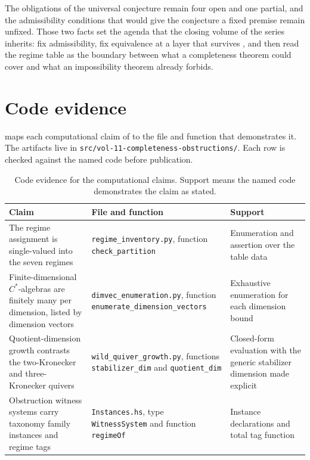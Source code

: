 \documentclass[11pt,letterpaper]{article}
\theoremstyle{definition}
\theoremstyle{remark}
\begin{document}
The obligations of the universal conjecture remain four open and one partial, and the admissibility conditions that would give the conjecture a fixed premise remain unfixed. Those two facts set the agenda that the closing volume of the series inherits: fix admissibility, fix equivalence at a layer that survives , and then read the regime table as the boundary between what a completeness theorem could cover and what an impossibility theorem already forbids.

\appendix
\section{Code evidence}

 maps each computational claim of  to the file and function that demonstrates it. The artifacts live in \texttt{src/vol-11-completeness-obstructions/}. Each row is checked against the named code before publication.

\begin{table}[ht]
\centering
\caption{Code evidence for the computational claims. Support means the named code demonstrates the claim as stated.}
\label{tab:code}
\footnotesize
\begin{tabular}{L{4.2cm}L{5.2cm}L{3.4cm}}
\toprule
Claim & File and function & Support \\
\midrule
The regime assignment is single-valued into the seven regimes & \texttt{regime\_inventory.py}, function \texttt{check\_partition} & Enumeration and assertion over the table data \\
Finite-dimensional $C^*$-algebras are finitely many per dimension, listed by dimension vectors & \texttt{dimvec\_enumeration.py}, function \texttt{enumerate\_dimension\_vectors} & Exhaustive enumeration for each dimension bound \\
Quotient-dimension growth contrasts the two-Kronecker and three-Kronecker quivers & \texttt{wild\_quiver\_growth.py}, functions \texttt{stabilizer\_dim} and \texttt{quotient\_dim} & Closed-form evaluation with the generic stabilizer dimension made explicit \\
Obstruction witness systems carry taxonomy family instances and regime tags & \texttt{Instances.hs}, type \texttt{WitnessSystem} and function \texttt{regimeOf} & Instance declarations and total tag function \\
\bottomrule
\end{tabular}
\end{table}
\end{document}
